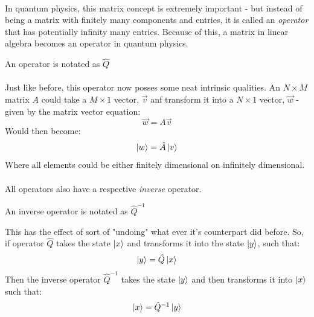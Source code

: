 \documentclass[12pt,letterpaper]{book}
\begin{document}
\paragraph*{}In quantum physics, this matrix concept is extremely important - but instead of being a matrix with finitely many components and entries, it is called an \textit{operator} that has potentially infinity many entries. Because of this, a matrix in linear algebra becomes an operator in quantum physics.
\begin{center}
An operator is notated as $\hat{Q}$
\end{center}
\paragraph*{}Just like before, this operator now posses some neat intrinsic qualities. An $N \times M$ matrix $A$ could take a $M \times 1$ vector, $\vec{v}$ anf transform it into a $N \times 1$ vector, $\vec{w}$ - given by the matrix vector equation:
\begin{equation}
\label{mat-vec}
\vec{w} =  A\vec{v}
\end{equation}
Would then become:
\begin{equation}
\label{op-ket}
\ket{w} = \hat{A}\ket{v}
\end{equation}
Where all elements could be either finitely dimensional on infinitely dimensional.
\paragraph*{}All operators also have a respective \textit{inverse} operator.
\begin{center}
An inverse operator is notated as $\hat{Q}^{-1}$
\end{center}
This has the effect of sort of "undoing" what ever it's counterpart did before. So, if operator $\hat{Q}$ takes the state $\ket{x}$ and transforms it into the state $\ket{y}$, such that:
\begin{equation}
\ket{y} = \hat{Q}\ket{x}
\end{equation}
Then the inverse operator $\hat{Q}^{-1}$ takes the state $\ket{y}$ and then transforms it into $\ket{x}$ such that:
\begin{equation}
\ket{x} = \hat{Q}^{-1}\ket{y}
\end{equation}
\end{document}
